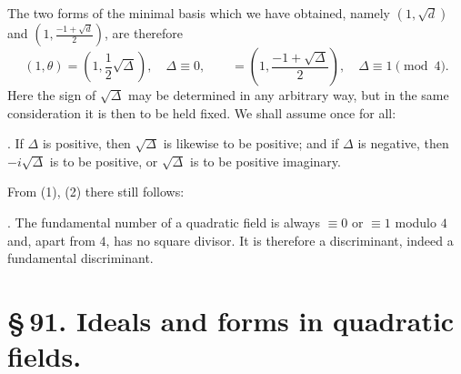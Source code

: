 \documentclass[11pt]{article}
\begin{document}
The two forms of the minimal basis which we have obtained, namely $(1,\sqrt d)$ and $\left(1,\frac{-1+\sqrt d}{2}\right)$, are therefore
\begin{equation}
 (1,\theta)=\left(1,\frac12\sqrt\Delta\right),\quad \Delta\equiv0,\qquad
 =\left(1,\frac{-1+\sqrt\Delta}{2}\right),\quad \Delta\equiv1\pmod4.
\tag{9}
\end{equation}
Here the sign of $\sqrt\Delta$ may be determined in any arbitrary way, but in the same consideration it is then to be held fixed. We shall assume once for all:

\medskip
{}. If $\Delta$ is positive, then $\sqrt\Delta$ is likewise to be positive; and if $\Delta$ is negative, then $-i\sqrt\Delta$ is to be positive, or $\sqrt\Delta$ is to be positive imaginary.
\medskip

From (1), (2) there still follows:

\medskip
{}. The fundamental number of a quadratic field is always $\equiv0$ or $\equiv1$ modulo $4$ and, apart from $4$, has no square divisor. It is therefore a discriminant, indeed a fundamental discriminant.


\section*{\S\,91. Ideals and forms in quadratic fields.}
\end{document}
